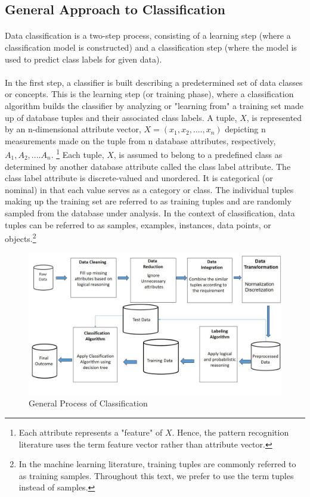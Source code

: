 \subsection{General Approach to Classification}
\paragraph{}
 Data classification is a two-step process, consisting of a learning step
(where a classification model is constructed) and a classification step (where the model is used to predict class
labels for given data).
\paragraph{}
In the first step, a classifier is built describing a predetermined set of data classes or concepts. This is the
learning step (or training phase), where a classification algorithm builds the classifier by analyzing or
"learning from" a training set made up of database tuples and their associated class labels. A tuple, $ X$, is
represented by an n-dimensional attribute vector, $ X= (x_{1},x_{2},....,x_{n})$ depicting n measurements made on the tuple from n database attributes, respectively, $A_{1},A_{2},....A_{n} $. \footnote{\label{first}Each attribute represents a "feature" of $X$. Hence, the pattern recognition literature uses the term feature vector rather than
attribute vector. } 
Each tuple, $X$, is assumed to belong to a predefined class as determined by another database attribute called the class label attribute. The class label
attribute is discrete-valued and unordered. It is categorical (or nominal) in that each value serves as a category
or class. The individual tuples making up the training set are referred to as training tuples and are randomly
sampled from the database under analysis. In the context of classification, data tuples can be referred to as
samples, examples, instances, data points, or objects.\footnote{\label{second}In the machine learning literature, training tuples are commonly referred to as training samples. Throughout this text, we prefer to use the term tuples instead of samples.}
\begin{figure}
   \centering
  \includegraphics[width=\linewidth]{Figures/classification.jpg}
  \decoRule
  \caption[Classification]{General Process of Classification}
  \label{fig:classification}
\end{figure}

